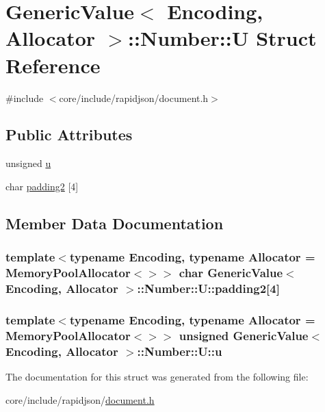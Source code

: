 \hypertarget{structGenericValue_1_1Number_1_1U}{}\section{Generic\+Value$<$ Encoding, Allocator $>$\+:\+:Number\+:\+:U Struct Reference}
\label{structGenericValue_1_1Number_1_1U}


{\ttfamily \#include $<$core/include/rapidjson/document.\+h$>$}

\subsection*{Public Attributes}
\begin{DoxyCompactItemize}
\item 
unsigned \hyperlink{structGenericValue_1_1Number_1_1U_a175e3a2bd43e6880791eb7c950d2f147}{u}
\item 
char \hyperlink{structGenericValue_1_1Number_1_1U_a9341f65c1645f24fd001a1ebf58d3c5b}{padding2} \mbox{[}4\mbox{]}
\end{DoxyCompactItemize}


\subsection{Member Data Documentation}
\subsubsection[{\texorpdfstring{padding2}{padding2}}]{\setlength{\rightskip}{0pt plus 5cm}template$<$typename Encoding, typename Allocator = Memory\+Pool\+Allocator$<$$>$$>$ char {\bf Generic\+Value}$<$ Encoding, Allocator $>$\+::Number\+::\+U\+::padding2\mbox{[}4\mbox{]}}\hypertarget{structGenericValue_1_1Number_1_1U_a9341f65c1645f24fd001a1ebf58d3c5b}{}\label{structGenericValue_1_1Number_1_1U_a9341f65c1645f24fd001a1ebf58d3c5b}
\subsubsection[{\texorpdfstring{u}{u}}]{\setlength{\rightskip}{0pt plus 5cm}template$<$typename Encoding, typename Allocator = Memory\+Pool\+Allocator$<$$>$$>$ unsigned {\bf Generic\+Value}$<$ Encoding, Allocator $>$\+::Number\+::\+U\+::u}\hypertarget{structGenericValue_1_1Number_1_1U_a175e3a2bd43e6880791eb7c950d2f147}{}\label{structGenericValue_1_1Number_1_1U_a175e3a2bd43e6880791eb7c950d2f147}


The documentation for this struct was generated from the following file\+:\begin{DoxyCompactItemize}
\item 
core/include/rapidjson/\hyperlink{document_8h}{document.\+h}\end{DoxyCompactItemize}
